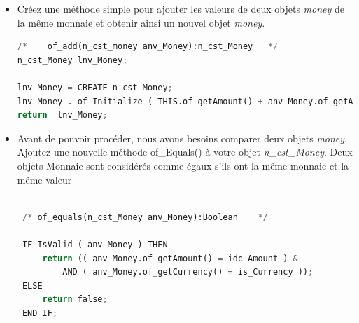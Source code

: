 \documentclass[a4paper,11pt,french]{refart}
\theoremstyle{definition}
\begin{document}
\begin{itemize}
\begin{lstlisting}[language=Python, caption=accesseur pour recuperer la monnaie de l'objet \textit{money}]
\end{lstlisting}
\item  Créez une méthode simple pour ajouter les valeurs de deux objets \textit{money} de la même monnaie et obtenir ainsi un nouvel objet \textit{money}.
\begin{lstlisting}[language=Python, caption=Simple addition de deux montants de la même monnaie]
  /*	of_add(n_cst_money anv_Money):n_cst_Money	*/
n_cst_Money	lnv_Money;

lnv_Money = CREATE n_cst_Money;
lnv_Money . of_Initialize ( THIS.of_getAmount() + anv_Money.of_getAmount(), THIS.of_getCurrency( ));
return	lnv_Money;

\end{lstlisting}
\item Avant de pouvoir procéder, nous avons besoins comparer deux objets \textit{money}.  
Ajoutez une nouvelle méthode of\_Equals() à votre objet \textit{n\_cst\_Money}.
 Deux objets Monnaie sont considérés comme égaux s'ils ont la même monnaie et la même valeur
 
 \begin{lstlisting}[language=Python, caption=Comparaison de deux objets \textit{money}]

 /*	of_equals(n_cst_Money anv_Money):Boolean	*/

 IF IsValid ( anv_Money ) THEN
     return (( anv_Money.of_getAmount() = idc_Amount ) &
         AND ( anv_Money.of_getCurrency() = is_Currency ));
 ELSE
     return false;
 END IF;
 
\end{lstlisting}
\end{itemize}


% 
% 
\end{document}
